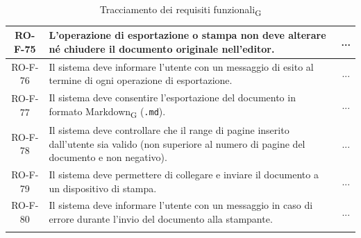 \documentclass[11pt,a4paper]{article}
\newcommand{\gls}[1]{#1\textsubscript{G}}
\begin{document}
\begin{longtable}{|c|p{11cm}|c|}
\hline
RO-F-75 & L'operazione di esportazione o stampa non deve alterare né chiudere il documento originale nell'editor. & ... \\
\hline
RO-F-76 & Il sistema deve informare l'utente con un messaggio di esito al termine di ogni operazione di esportazione. & ... \\
\hline
RO-F-77 & Il sistema deve consentire l'esportazione del documento in formato \gls{Markdown} (\texttt{.md}). & ... \\
\hline
RO-F-78 & Il sistema deve controllare che il range di pagine inserito dall'utente sia valido (non superiore al numero di pagine del documento e non negativo). & ... \\
\hline
RO-F-79 & Il sistema deve permettere di collegare e inviare il documento a un dispositivo di stampa. & ... \\
\hline
RO-F-80 & Il sistema deve informare l'utente con un messaggio in caso di errore durante l'invio del documento alla stampante. & ... \\
\hline
\addlinespace[1em]
\caption{Tracciamento dei \gls{requisiti funzionali}}
\label{tab:tracciamento_requisiti_funzionali}
\end{longtable}
\end{document}
